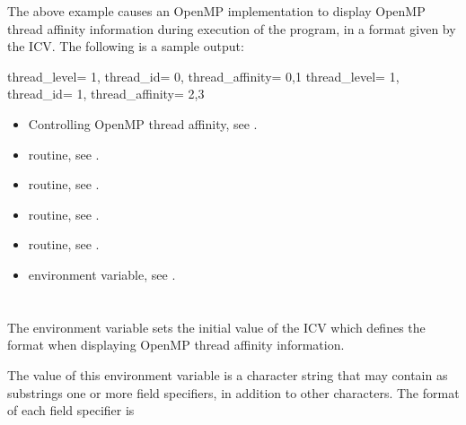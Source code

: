 The above example causes an OpenMP implementation to display OpenMP thread affinity information during execution of
the program, in a format given by the  ICV.  The following is a sample output:
\begin{ompSyntax}
thread_level=   1,   thread_id=   0,   thread_affinity=    0,1
thread_level=   1,   thread_id=   1,   thread_affinity=    2,3
\end{ompSyntax}

\crossreferences
\begin{itemize}

\item Controlling OpenMP thread affinity, see
.
\item {} routine, see .
\item {} routine, see .
\item {} routine, see .
\item {} routine, see .
\item {} environment variable, see
.
\end{itemize}


\section{}
\label{sec:OMP_AFFINITY_FORMAT}

The  environment variable sets the initial value of the
 ICV which defines the format when displaying OpenMP
thread affinity information.


The value of this environment variable is a character string that may contain as
substrings one or more field specifiers, in addition to other characters.
The format of each field specifier is

\begin{ompSyntax}
\end{ompSyntax}

